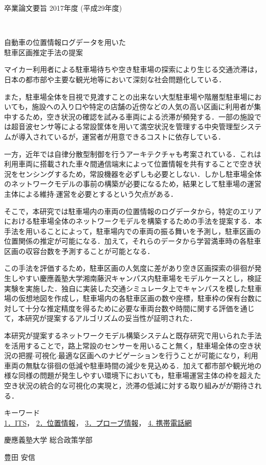 
卒業論文要旨 2017年度 (平成29年度)

~ \bigskip ~ \\
\begin{center}
\begin{large}
  自動車の位置情報ログデータを用いた\\
  駐車区画推定手法の提案
\end{large}
\end{center}

マイカー利用者による駐車場待ちや空き駐車場の探索により生じる交通渋滞は，日本の都市部や主要な観光地等において深刻な社会問題化している．

また，駐車場全体を目視で見渡すことの出来ない大型駐車場や階層型駐車場においても，施設への入り口や特定の店舗の近傍などの人気の高い区画に利用者が集中するため，空き状況の確認を試みる車両による渋滞が頻発する．一部の施設では超音波センサ等による常設筐体を用いて満空状況を管理する中央管理型システムが導入されているが，運営者が用意できるコストに依存している．
 
一方，近年では自律分散型制御を行うアーキテクチャも考案されている．これは利用車両に搭載された車々間通信端末によって位置情報を共有することで空き状況をセンシングするため，常設機器を必ずしも必要としない．しかし駐車場全体のネットワークモデルの事前の構築が必要になるため，結果として駐車場の運営主体による維持$\cdot$運営を必要とするという欠点がある．


そこで，本研究では駐車場内の車両の位置情報のログデータから，特定のエリアにおける駐車場全体のネットワークモデルを構築するための手法を提案する．本手法を用いることによって，駐車場内での車両の振る舞いを予測し，駐車区画の位置関係の推定が可能になる．加えて，それらのデータから学習満車時の各駐車区画の収容台数を予測することが可能となる．


この手法を評価するため，駐車区画の人気度に差があり空き区画探索の徘徊が発生しやすい慶應義塾大学湘南藤沢キャンパス内駐車場をモデルケースとし，検証実験を実施した．独自に実装した交通シミュレータ上でキャンパスを模した駐車場の仮想地図を作成し，駐車場内の各駐車区画の数や座標，駐車枠の保有台数に対して十分な推定精度を得るために必要な車両台数や時間に関する評価を通じて，本研究が提案するアルゴリズムの妥当性が証明された．

本研究が提案するネットワークモデル構築システムと既存研究で用いられた手法を活用することで，路上常設のセンサーを用いること無く，駐車場全体の空き状況の把握$\cdot$可視化$\cdot$最適な区画へのナビゲーションを行うことが可能になり，利用車両の無駄な徘徊の低減や駐車時間の減少を見込める．加えて都市部や観光地の様な同様の問題が発生しやすい環境下においても，駐車場運営主体の枠を超えた空き状況の統合的な可視化の実現と，渋滞の低減に対する取り組みがが期待される．

キーワード \\
\underline{1．ITS}，
\underline{2．位置情報}，
\underline{3．プローブ情報}，
\underline{4. 携帯電話網}
\begin{flushright}
慶應義塾大学 総合政策学部\\
\begin{large}
  豊田 安信
\end{large}
\end{flushright}

